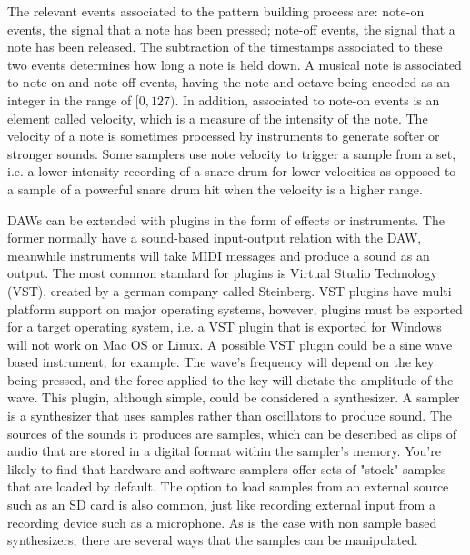 \documentclass[12pt, a4paper, hidelinks]{article}
\begin{document}
	The relevant events associated to the pattern building process are: note-on events, the signal that a note has been pressed; note-off events, the signal that a note has been released. The subtraction of the timestamps associated to these two events determines how long a note is held down. A musical note is associated to note-on and note-off events, having the note and octave being encoded as an integer in the range of $[0, 127)$. In addition, associated to note-on events is an element called velocity, which is a measure of the intensity of the note. The velocity of a note is sometimes processed by instruments to generate softer or stronger sounds. Some samplers use note velocity to trigger a sample from a set, i.e. a lower intensity recording of a snare drum for lower velocities as opposed to a sample of a powerful snare drum hit when the velocity is a higher range.
 	\par
 	
	DAWs can be extended with plugins in the form of effects or instruments. The former normally have a sound-based input-output relation with the DAW, meanwhile instruments will take MIDI messages and produce a sound as an output. The most common standard for plugins is Virtual Studio Technology (VST), created by a german company called Steinberg. VST plugins have multi platform support on major operating systems, however, plugins must be exported for a target operating system, i.e. a VST plugin that is exported for Windows will not work on Mac OS or Linux. A possible VST plugin could be a sine wave based instrument, for example. The wave's frequency will depend on the key being pressed, and the force applied to the key will dictate the amplitude of the wave. This plugin, although simple, could be considered a synthesizer. A sampler is a synthesizer that uses samples rather than oscillators to produce sound.  The sources of the sounds it produces are samples, which can be described as clips of audio that are stored in a digital format within the sampler's memory. You're likely to find that hardware and software samplers offer sets of "stock" samples that are loaded by default. The option to load samples from an external source such as an SD card is also common, just like recording external input from a recording device such as a microphone. As is the case with non sample based synthesizers, there are several ways that the samples can be manipulated.\par
	
\end{document}
